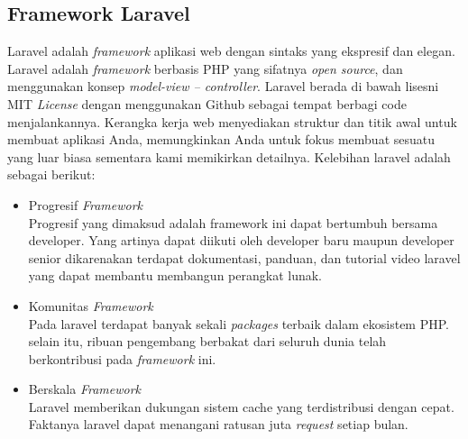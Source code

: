 \subsection{Framework Laravel}
Laravel adalah \textit{framework} aplikasi web dengan sintaks yang ekspresif dan elegan. Laravel adalah \textit{framework} berbasis PHP yang sifatnya \textit{open source}, dan menggunakan konsep \textit{model-view – controller}. Laravel berada di bawah lisesni MIT \textit{License} dengan menggunakan Github sebagai tempat berbagi code menjalankannya. Kerangka kerja web menyediakan struktur dan titik awal untuk membuat aplikasi Anda, memungkinkan Anda untuk fokus membuat sesuatu yang luar biasa sementara kami memikirkan detailnya. Kelebihan laravel adalah sebagai berikut:

\begin{itemize}
	\item Progresif \textit{Framework} \\
	Progresif yang dimaksud adalah framework ini dapat bertumbuh bersama developer. Yang artinya dapat diikuti oleh developer baru maupun developer senior dikarenakan terdapat dokumentasi, panduan, dan tutorial video laravel yang dapat membantu membangun perangkat lunak.
	\item Komunitas \textit{Framework} \\
	Pada laravel terdapat banyak sekali \textit{packages} terbaik dalam ekosistem PHP. selain itu, ribuan pengembang berbakat dari seluruh dunia telah berkontribusi pada \textit{framework} ini.
	\item Berskala \textit{Framework} \\
	Laravel memberikan dukungan sistem cache yang terdistribusi dengan cepat. Faktanya laravel dapat menangani ratusan juta \textit{request} setiap bulan.
\end{itemize}

